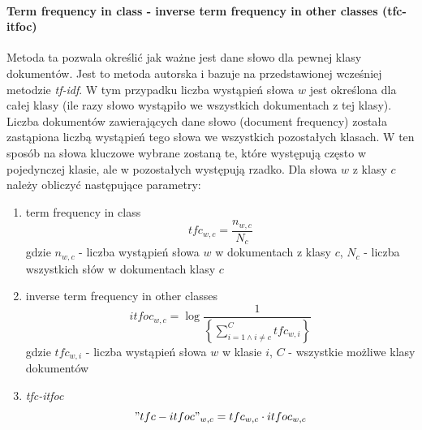 \documentclass{classrep}
\begin{document}
{{{                \paragraph{Term frequency in class - inverse term frequency in other classes
                (tfc-itfoc)} {
                    Metoda ta pozwala określić jak ważne jest dane słowo dla pewnej klasy dokumentów. Jest to metoda autorska i bazuje
                    na przedstawionej wcześniej metodzie \emph{tf-idf}. W tym przypadku liczba wystąpień słowa $w$ jest określona dla całej
                    klasy (ile razy słowo wystąpiło we wszystkich dokumentach z tej klasy). Liczba dokumentów zawierających dane słowo
                    (document frequency) została zastąpiona liczbą wystąpień tego słowa we wszystkich pozostałych klasach. W ten sposób
                    na słowa kluczowe wybrane zostaną te, które występują często w pojedynczej klasie, ale w pozostałych występują rzadko.
                    Dla słowa $w$ z klasy $c$ należy obliczyć następujące parametry:
                    \begin{enumerate}
                        \item term frequency in class
                        \begin{equation}
                            tfc_{w,c} = \frac{n_{w,c}}{N_{c}}
                        \end{equation}
                        gdzie $n_{w,c}$ - liczba wystąpień słowa $w$ w dokumentach z klasy $c$, $N_c$ - liczba wszystkich słów w dokumentach klasy $c$
                        \item inverse term frequency in other classes
                        \begin{equation}
                            itfoc_{w,c} = \log\frac{1}{\left \{  \sum_{i=1 \land i \ne c}^{C} tfc_{w,i}\right \}}
                        \end{equation}
                        gdzie $tfc_{w,i}$ - liczba wystąpień słowa $w$ w klasie $i$, $C$ - wszystkie możliwe klasy dokumentów
                        \item \emph{tfc-itfoc}
                        \begin{equation}
                            "tfc-itfoc"_{w,c} = tfc_{w,c} \cdot itfoc_{w,c}
                        \end{equation}
                    \end{enumerate}
                }
            }

}}
\end{document}
